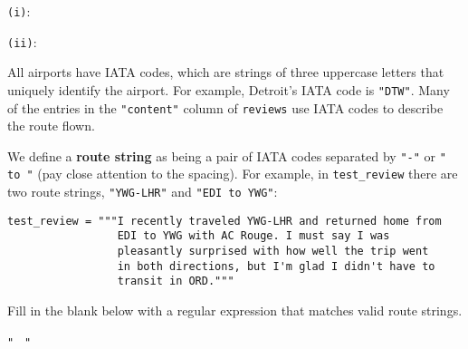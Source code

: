 \documentclass[twoside,12pt]{article}
\begin{document}
\begin{probset}
\begin{prob}[(10 pts)]
\begin{prob}[(8 pts)]
\begin{subprobset}
\begin{subprob}
\texttt{(i)}: \hspace{0.01in} \inlineresponsebox[4in]{}

\texttt{(ii)}: \inlineresponsebox[4in]{}
    
\end{subprob}



    

\end{subprobset}
    
    
\end{prob}

\vspace{0.4in }

\begin{prob}[(4 pts)] 

All airports have IATA codes, which are strings of three uppercase letters that uniquely identify the airport. For example, Detroit's IATA code is \texttt{"DTW"}. Many of the entries in the \texttt{"content"} column of \texttt{reviews} use IATA codes to describe the route flown.

We define a \textbf{route string} as being a pair of IATA codes separated by \texttt{"-"} or \texttt{" to "} (pay close attention to the spacing). For example, in \texttt{test\_review} there are two route strings, \texttt{"YWG-LHR"} and \texttt{"EDI to YWG"}:

\begin{verbatim}
test_review = """I recently traveled YWG-LHR and returned home from 
                 EDI to YWG with AC Rouge. I must say I was
                 pleasantly surprised with how well the trip went
                 in both directions, but I'm glad I didn't have to
                 transit in ORD."""
\end{verbatim}

Fill in the blank below with a regular expression that matches valid route strings.

\begin{center}
\texttt{" }\biginlineresponsebox[6in]{} \texttt{"}
\end{center}
    

\end{prob}
\end{prob}
\end{probset}
\end{document}
